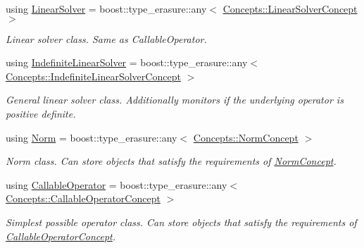 \begin{DoxyCompactItemize}
using \hyperlink{namespaceSpacy_a7d5cd1c6fb9dd85aa345b536caf30bba_a7d5cd1c6fb9dd85aa345b536caf30bba}{Linear\+Solver} = boost\+::type\+\_\+erasure\+::any$<$ \hyperlink{group__ConceptGroup_gac7d6a94c7131c8613e2ab26fddeb50bd_gac7d6a94c7131c8613e2ab26fddeb50bd}{Concepts\+::\+Linear\+Solver\+Concept} $>$
\begin{DoxyCompactList}\small\item\em Linear solver class. Same as Callable\+Operator. \end{DoxyCompactList}\item 
using \hyperlink{namespaceSpacy_a168383be933a8316169c145f5e419604_a168383be933a8316169c145f5e419604}{Indefinite\+Linear\+Solver} = boost\+::type\+\_\+erasure\+::any$<$ \hyperlink{group__ConceptGroup_ga582dd34334cdecc7b27883f4e8239490_ga582dd34334cdecc7b27883f4e8239490}{Concepts\+::\+Indefinite\+Linear\+Solver\+Concept} $>$
\begin{DoxyCompactList}\small\item\em General linear solver class. Additionally monitors if the underlying operator is positive definite. \end{DoxyCompactList}\item 
using \hyperlink{group__SpacyGroup_gaf4f33b11d657c48566d961a013c92bd1_gaf4f33b11d657c48566d961a013c92bd1}{Norm} = boost\+::type\+\_\+erasure\+::any$<$ \hyperlink{group__ConceptGroup_ga8b6032c46f6e31840a2c956c6360549b_ga8b6032c46f6e31840a2c956c6360549b}{Concepts\+::\+Norm\+Concept} $>$
\begin{DoxyCompactList}\small\item\em Norm class. Can store objects that satisfy the requirements of \hyperlink{group__ConceptGroup_ga8b6032c46f6e31840a2c956c6360549b_NormConceptAnchor}{Norm\+Concept}. \end{DoxyCompactList}\item 
using \hyperlink{group__SpacyGroup_ga2b74020d806ad800795cdd97dab3466f_ga2b74020d806ad800795cdd97dab3466f}{Callable\+Operator} = boost\+::type\+\_\+erasure\+::any$<$ \hyperlink{group__ConceptGroup_gadec0c664abaacc2065dadd8b11cc8d30_gadec0c664abaacc2065dadd8b11cc8d30}{Concepts\+::\+Callable\+Operator\+Concept} $>$
\begin{DoxyCompactList}\small\item\em Simplest possible operator class. Can store objects that satisfy the requirements of \hyperlink{group__ConceptGroup_gadec0c664abaacc2065dadd8b11cc8d30_CallableOperatorConceptAnchor}{Callable\+Operator\+Concept}. \end{DoxyCompactList}\item 

\end{DoxyCompactItemize}
